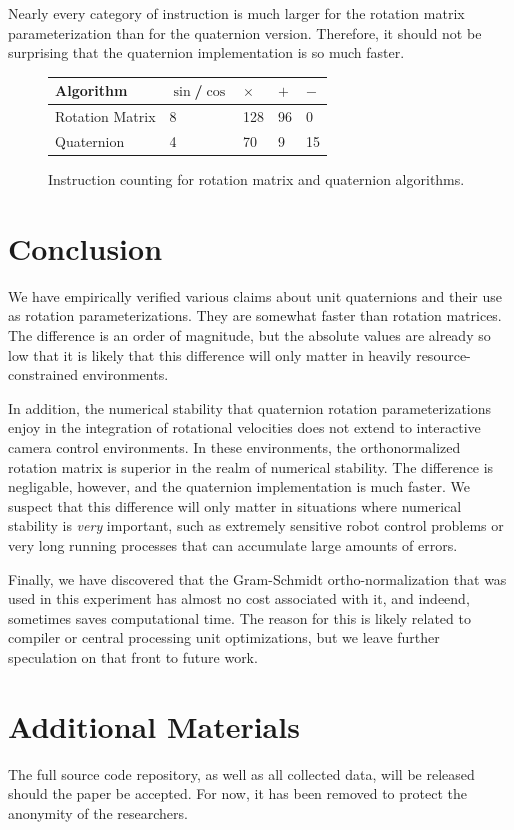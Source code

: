 \documentclass{acm_proc_article-sp}
\begin{document}
Nearly every category of instruction is much larger for the rotation matrix parameterization than for the quaternion version.
Therefore, it should not be surprising that the quaternion implementation is so much faster.

\begin{figure}
\begin{tabular}{l|l|l|l|l}
    Algorithm       & $\sin$/$\cos$  & $\times$      & $+$       & $-$  \\
    \hline
    Rotation Matrix & 8              & 128           & 96        & 0             \\
    Quaternion      & 4              & 70            & 9         & 15            \\

\end{tabular}
\caption{Instruction counting for rotation matrix and quaternion algorithms.}
\label{fig:counting}
\end{figure}

\section{Conclusion}

We have empirically verified various claims about unit quaternions and their use as rotation parameterizations.
They are somewhat faster than rotation matrices.
The difference is an order of magnitude, but the absolute values are already so low that it is likely that this difference will only matter in heavily resource-constrained environments.

In addition, the numerical stability that quaternion rotation parameterizations enjoy in the integration of rotational velocities does not extend to interactive camera control environments.
In these environments, the orthonormalized rotation matrix is superior in the realm of numerical stability.
The difference is negligable, however, and the quaternion implementation is much faster.
We suspect that this difference will only matter in situations where numerical stability is \emph{very} important, such as extremely sensitive robot control problems or very long running processes that can accumulate large amounts of errors.

Finally, we have discovered that the Gram-Schmidt ortho-normalization that was used in this experiment has almost no cost associated with it, and indeend, sometimes saves computational time.
The reason for this is likely related to compiler or central processing unit optimizations, but we leave further speculation on that front to future work.

\section{Additional Materials}

The full source code repository, as well as all collected data, will be released should the paper be accepted.
For now, it has been removed to protect the anonymity of the researchers.



\end{document}
